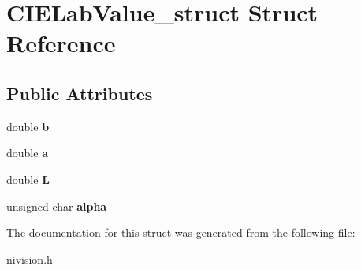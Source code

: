 \hypertarget{structCIELabValue__struct}{\section{\-C\-I\-E\-Lab\-Value\-\_\-struct \-Struct \-Reference}
\label{structCIELabValue__struct}
}
\subsection*{\-Public \-Attributes}
\begin{DoxyCompactItemize}
\item 
\hypertarget{structCIELabValue__struct_a90f6724d38b9f85bb78fe8a0e92f4ac6}{double {\bfseries b}}\label{structCIELabValue__struct_a90f6724d38b9f85bb78fe8a0e92f4ac6}

\item 
\hypertarget{structCIELabValue__struct_a7e22c73587998981a6ef55d44adec341}{double {\bfseries a}}\label{structCIELabValue__struct_a7e22c73587998981a6ef55d44adec341}

\item 
\hypertarget{structCIELabValue__struct_af730eb61f988c231e877d3ca4dd6aabe}{double {\bfseries \-L}}\label{structCIELabValue__struct_af730eb61f988c231e877d3ca4dd6aabe}

\item 
\hypertarget{structCIELabValue__struct_a2ba5652f9d79e1da8a35296aad2554fa}{unsigned char {\bfseries alpha}}\label{structCIELabValue__struct_a2ba5652f9d79e1da8a35296aad2554fa}

\end{DoxyCompactItemize}


\-The documentation for this struct was generated from the following file\-:\begin{DoxyCompactItemize}
\item 
nivision.\-h\end{DoxyCompactItemize}
